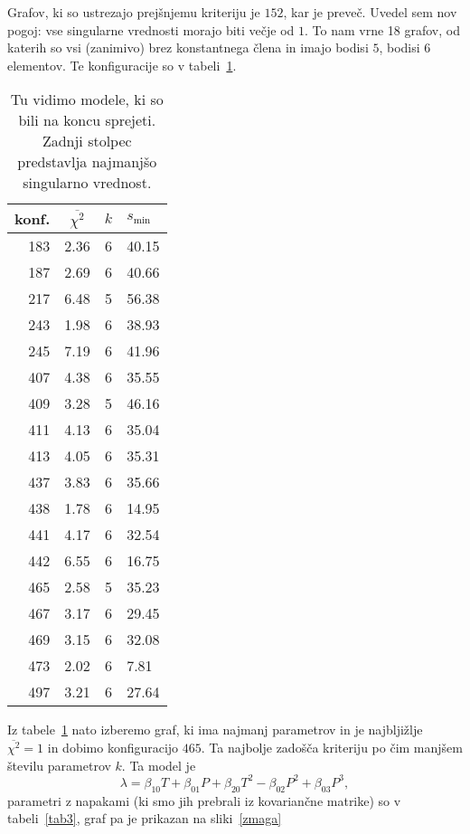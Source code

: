 \documentclass[a4 paper, 12pt]{article}
\begin{document}
Grafov, ki so ustrezajo prej\v snjemu kriteriju je $152$, kar je preve\v c. Uvedel sem nov pogoj: vse singularne
vrednosti morajo biti ve\v cje od $1$. To nam vrne 18 grafov, od katerih so vsi (zanimivo) brez konstantnega \v clena
in imajo bodisi $5$, bodisi $6$ elementov. Te konfiguracije so v tabeli~\ref{tab2}.
\begin{table}[H]\centering
	\caption{Tu vidimo modele, ki so bili na koncu sprejeti. Zadnji stolpec predstavlja najmanj\v so singularno
		vrednost.}
	\begin{tabular}{r|c|c|l}
		konf. & $\overline{\chi^2}$ & $k$ & $s_\text{min}$ \\
		\hline\hline
		183 & 2.36 & 6 & 40.15 \\
		187 & 2.69 & 6 & 40.66 \\
		217 & 6.48 & 5 & 56.38 \\
		243 & 1.98 & 6 & 38.93 \\
		245 & 7.19 & 6 & 41.96 \\
		407 & 4.38 & 6 & 35.55 \\
		409 & 3.28 & 5 & 46.16 \\
		411 & 4.13 & 6 & 35.04 \\
		413 & 4.05 & 6 & 35.31 \\
		437 & 3.83 & 6 & 35.66 \\
		438 & 1.78 & 6 & 14.95 \\
		441 & 4.17 & 6 & 32.54 \\
		442 & 6.55 & 6 & 16.75 \\
		465 & 2.58 & 5 & 35.23 \\
		467 & 3.17 & 6 & 29.45 \\
		469 & 3.15 & 6 & 32.08 \\
		473 & 2.02 & 6 & 7.81 \\
		497 & 3.21 & 6 & 27.64
	\end{tabular}
	\label{tab2}
\end{table}
Iz tabele~\ref{tab2} nato izberemo graf, ki ima najmanj parametrov in je najblji\v zlje $\overline{\chi^2} = 1$ in dobimo
konfiguracijo $465$. Ta najbolje zado\v s\v ca kriteriju po \v cim manj\v sem \v stevilu parametrov $k$. Ta model je
\begin{equation}
	\lambda = \beta_{10} T + \beta_{01} P + \beta_{20} T^2 - \beta_{02} P^2 + \beta_{03} P^3,
\end{equation}
parametri z napakami (ki smo jih prebrali iz kovarian\v cne matrike) so v tabeli~\ref{tab3}, graf pa je prikazan
na sliki~\ref{zmaga}
\end{document}
